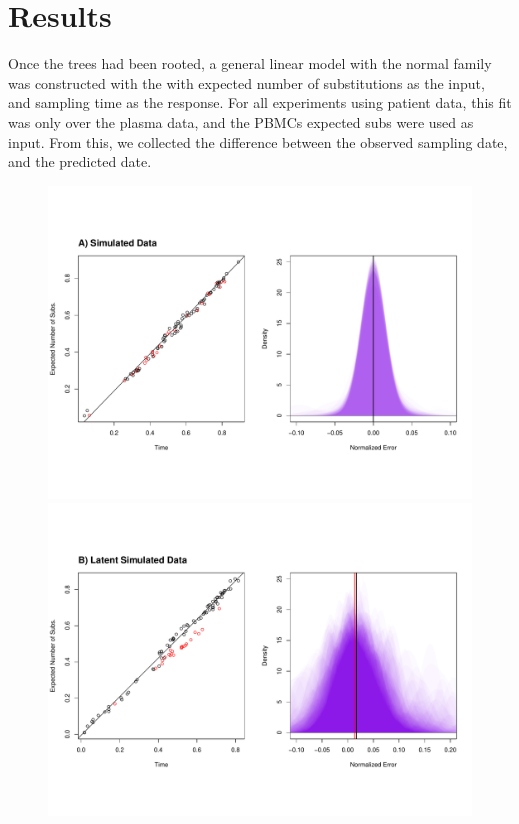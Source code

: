 \section{Results} \label{sec:results}
Once the trees had been rooted, a general linear model with the normal family was constructed with the with expected number of substitutions as the input, and sampling time as the response. For all experiments using patient data, this fit was only over the plasma data, and the PBMCs expected subs were used as input. From this, we collected the difference between the observed sampling date, and the predicted date. 

\begin{figure}[!ht] \label{fig:results1}
	\centering
	\includegraphics[trim=0cm 0cm 0cm 6cm, clip=true, scale=0.25]{figures/simulated.pdf} \\
	\includegraphics[trim=0cm 0cm 0cm 7cm, clip=true,scale=0.25]{figures/simulated_latent.pdf}\\

\end{figure}
